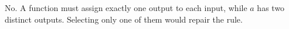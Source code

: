 No. A function must assign exactly one output to each input, while $a$ has two distinct outputs. Selecting only one of them would repair the rule.
